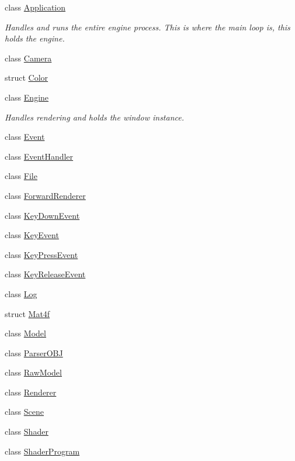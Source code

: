 \begin{DoxyCompactItemize}
\item 
class \hyperlink{classpcs_1_1Application}{Application}
\begin{DoxyCompactList}\small\item\em Handles and runs the entire engine process. This is where the main loop is, this holds the engine. \end{DoxyCompactList}\item 
class \hyperlink{classpcs_1_1Camera}{Camera}
\item 
struct \hyperlink{structpcs_1_1Color}{Color}
\item 
class \hyperlink{classpcs_1_1Engine}{Engine}
\begin{DoxyCompactList}\small\item\em Handles rendering and holds the window instance. \end{DoxyCompactList}\item 
class \hyperlink{classpcs_1_1Event}{Event}
\item 
class \hyperlink{classpcs_1_1EventHandler}{Event\+Handler}
\item 
class \hyperlink{classpcs_1_1File}{File}
\item 
class \hyperlink{classpcs_1_1ForwardRenderer}{Forward\+Renderer}
\item 
class \hyperlink{classpcs_1_1KeyDownEvent}{Key\+Down\+Event}
\item 
class \hyperlink{classpcs_1_1KeyEvent}{Key\+Event}
\item 
class \hyperlink{classpcs_1_1KeyPressEvent}{Key\+Press\+Event}
\item 
class \hyperlink{classpcs_1_1KeyReleaseEvent}{Key\+Release\+Event}
\item 
class \hyperlink{classpcs_1_1Log}{Log}
\item 
struct \hyperlink{structpcs_1_1Mat4f}{Mat4f}
\item 
class \hyperlink{classpcs_1_1Model}{Model}
\item 
class \hyperlink{classpcs_1_1ParserOBJ}{Parser\+O\+BJ}
\item 
class \hyperlink{classpcs_1_1RawModel}{Raw\+Model}
\item 
class \hyperlink{classpcs_1_1Renderer}{Renderer}
\item 
class \hyperlink{classpcs_1_1Scene}{Scene}
\item 
class \hyperlink{classpcs_1_1Shader}{Shader}
\item 
class \hyperlink{classpcs_1_1ShaderProgram}{Shader\+Program}

\end{DoxyCompactItemize}
